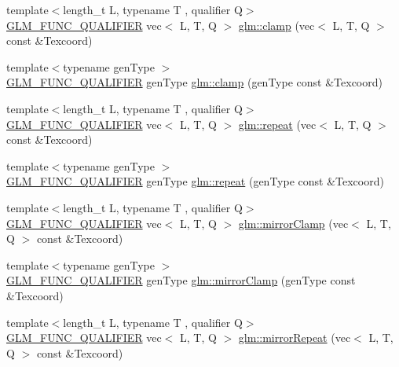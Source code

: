 \begin{DoxyCompactItemize}
\item 
{\footnotesize template$<$length\+\_\+t L, typename T , qualifier Q$>$ }\\\mbox{\hyperlink{setup_8hpp_a33fdea6f91c5f834105f7415e2a64407}{G\+L\+M\+\_\+\+F\+U\+N\+C\+\_\+\+Q\+U\+A\+L\+I\+F\+I\+ER}} vec$<$ L, T, Q $>$ \mbox{\hyperlink{namespaceglm_a995eb73b18cbce2bef8f5008794ee0e9}{glm\+::clamp}} (vec$<$ L, T, Q $>$ const \&Texcoord)
\item 
{\footnotesize template$<$typename gen\+Type $>$ }\\\mbox{\hyperlink{setup_8hpp_a33fdea6f91c5f834105f7415e2a64407}{G\+L\+M\+\_\+\+F\+U\+N\+C\+\_\+\+Q\+U\+A\+L\+I\+F\+I\+ER}} gen\+Type \mbox{\hyperlink{group__gtx__wrap_ga6c0cc6bd1d67ea1008d2592e998bad33}{glm\+::clamp}} (gen\+Type const \&Texcoord)
\item 
{\footnotesize template$<$length\+\_\+t L, typename T , qualifier Q$>$ }\\\mbox{\hyperlink{setup_8hpp_a33fdea6f91c5f834105f7415e2a64407}{G\+L\+M\+\_\+\+F\+U\+N\+C\+\_\+\+Q\+U\+A\+L\+I\+F\+I\+ER}} vec$<$ L, T, Q $>$ \mbox{\hyperlink{namespaceglm_a037020611fc03af26739979810a52e21}{glm\+::repeat}} (vec$<$ L, T, Q $>$ const \&Texcoord)
\item 
{\footnotesize template$<$typename gen\+Type $>$ }\\\mbox{\hyperlink{setup_8hpp_a33fdea6f91c5f834105f7415e2a64407}{G\+L\+M\+\_\+\+F\+U\+N\+C\+\_\+\+Q\+U\+A\+L\+I\+F\+I\+ER}} gen\+Type \mbox{\hyperlink{group__gtx__wrap_ga809650c6310ea7c42666e918c117fb6f}{glm\+::repeat}} (gen\+Type const \&Texcoord)
\item 
{\footnotesize template$<$length\+\_\+t L, typename T , qualifier Q$>$ }\\\mbox{\hyperlink{setup_8hpp_a33fdea6f91c5f834105f7415e2a64407}{G\+L\+M\+\_\+\+F\+U\+N\+C\+\_\+\+Q\+U\+A\+L\+I\+F\+I\+ER}} vec$<$ L, T, Q $>$ \mbox{\hyperlink{namespaceglm_af12378685ea2b5dacd7a06b026f3f519}{glm\+::mirror\+Clamp}} (vec$<$ L, T, Q $>$ const \&Texcoord)
\item 
{\footnotesize template$<$typename gen\+Type $>$ }\\\mbox{\hyperlink{setup_8hpp_a33fdea6f91c5f834105f7415e2a64407}{G\+L\+M\+\_\+\+F\+U\+N\+C\+\_\+\+Q\+U\+A\+L\+I\+F\+I\+ER}} gen\+Type \mbox{\hyperlink{group__gtx__wrap_gaa6856a0a048d2749252848da35e10c8b}{glm\+::mirror\+Clamp}} (gen\+Type const \&Texcoord)
\item 
{\footnotesize template$<$length\+\_\+t L, typename T , qualifier Q$>$ }\\\mbox{\hyperlink{setup_8hpp_a33fdea6f91c5f834105f7415e2a64407}{G\+L\+M\+\_\+\+F\+U\+N\+C\+\_\+\+Q\+U\+A\+L\+I\+F\+I\+ER}} vec$<$ L, T, Q $>$ \mbox{\hyperlink{namespaceglm_a0df04698e1e331775337ec31c8967445}{glm\+::mirror\+Repeat}} (vec$<$ L, T, Q $>$ const \&Texcoord)

\end{DoxyCompactItemize}
